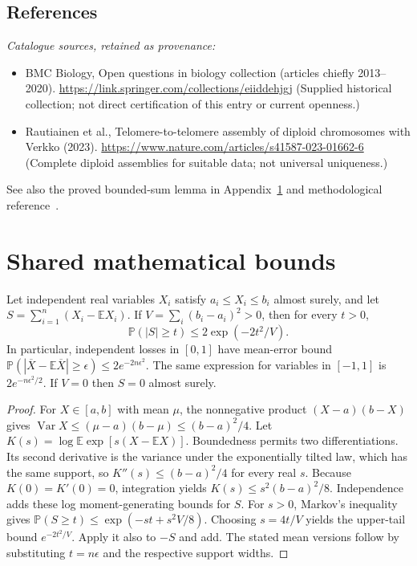 \documentclass[11pt]{article}
\begin{document}
\subsection{References}
\noindent\emph{Catalogue sources, retained as provenance:}
\begin{itemize}
\item BMC Biology, Open questions in biology collection (articles chiefly 2013--2020). \url{https://link.springer.com/collections/eiiddehjgj} (Supplied historical collection; not direct certification of this entry or current openness.)
\item Rautiainen et al., Telomere-to-telomere assembly of diploid chromosomes with Verkko (2023). \url{https://www.nature.com/articles/s41587-023-01662-6} (Complete diploid assemblies for suitable data; not universal uniqueness.)
\end{itemize}
\noindent See also the proved bounded-sum lemma in Appendix~\ref{app:bounds} and methodological reference~\cite{hoeffding}.




\section{Shared mathematical bounds}\label{app:bounds}
\begin{lemma}\label{lem:bounded}
Let independent real variables $X_i$ satisfy $a_i\leq X_i\leq b_i$ almost surely,
and let $S=\sum_{i=1}^n(X_i-\mathbb{E} X_i)$. If
$V=\sum_i(b_i-a_i)^2>0$, then for every $t>0$,
\[
 \mathbb{P}(|S|\geq t)\leq 2\exp(-2t^2/V).
\]
In particular, independent losses in $[0,1]$ have mean-error bound
$\mathbb{P}(|\overline X-\mathbb{E}\overline X|\geq\epsilon)
\leq2e^{-2n\epsilon^2}$. The same expression for variables in $[-1,1]$
is $2e^{-n\epsilon^2/2}$. If $V=0$ then $S=0$ almost surely.
\end{lemma}
\begin{proof}
For $X\in[a,b]$ with mean $\mu$, the nonnegative product
$(X-a)(b-X)$ gives
$\operatorname{Var} X\leq(\mu-a)(b-\mu)\leq(b-a)^2/4$.
Let $K(s)=\log\mathbb{E}\exp[s(X-\mathbb{E} X)]$.
Boundedness permits two differentiations. Its second derivative is the variance
under the exponentially tilted law, which has the same support, so
$K''(s)\leq(b-a)^2/4$ for every real $s$.
Because $K(0)=K'(0)=0$, integration yields
$K(s)\leq s^2(b-a)^2/8$.
Independence adds these log moment-generating bounds for $S$.
For $s>0$, Markov's inequality gives
$\mathbb{P}(S\geq t)\leq\exp(-st+s^2V/8)$.
Choosing $s=4t/V$ yields the upper-tail bound $e^{-2t^2/V}$.
Apply it also to $-S$ and add. The stated mean versions follow by substituting
$t=n\epsilon$ and the respective support widths.
\end{proof}
\end{document}
